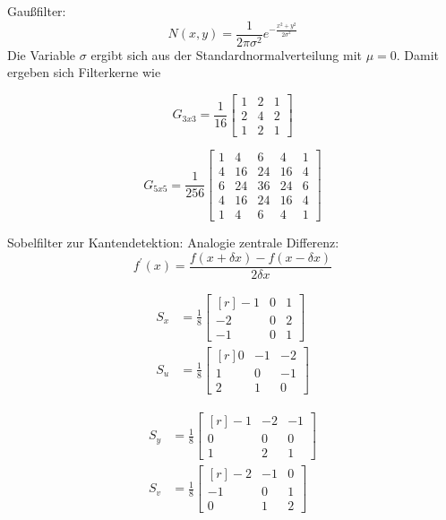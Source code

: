 Gau\ss{}filter:
\begin{equation}
 N(x, y) = \frac{1}{2\pi\sigma^2} e^{-\frac{x^2+y^2}{2\sigma^2}}
\end{equation}
Die Variable \( \sigma \) ergibt sich aus der Standardnormalverteilung mit \( \mu=0 \). Damit ergeben sich Filterkerne wie
\begin{multicols}{2}

\begin{equation*}
 G_{3x3}=\frac{1}{16} \begin{bmatrix} 1&2&1 \\ 2&4&2 \\ 1&2&1 \end{bmatrix}
\end{equation*}
 
 \columnbreak
 \begin{equation*}
 G_{5x5}=\frac{1}{256} \begin{bmatrix} 1&4&6&4&1 \\ 4&16&24&16&4 \\ 6&24&36&24&6 \\ 4&16&24&16&4 \\ 1&4&6&4&1 \end{bmatrix}
\end{equation*}
 
\end{multicols}



Sobelfilter zur Kantendetektion:
Analogie zentrale Differenz:
\begin{equation*}
 f^\prime (x)=\frac{f(x+\delta x)-f(x-\delta x)}{2\delta x}
\end{equation*}

\begin{multicols}{2}
\begin{align*}
 S_x &= \frac{1}{8} \begin{bmatrix}[r] -1&0&1 \\ -2&0&2 \\ -1&0&1 \end{bmatrix} \\
 S_u &= \frac{1}{8} \begin{bmatrix}[r] 0&-1&-2 \\ 1&0&-1 \\ 2&1&0 \end{bmatrix}
\end{align*}

\columnbreak

\begin{align*}
 S_y &= \frac{1}{8} \begin{bmatrix}[r] -1&-2&-1 \\ 0&0&0 \\ 1&2&1 \end{bmatrix} \\
 S_v &= \frac{1}{8} \begin{bmatrix}[r] -2&-1&0 \\ -1&0&1 \\ 0&1&2 \end{bmatrix}
\end{align*}
\end{multicols}


